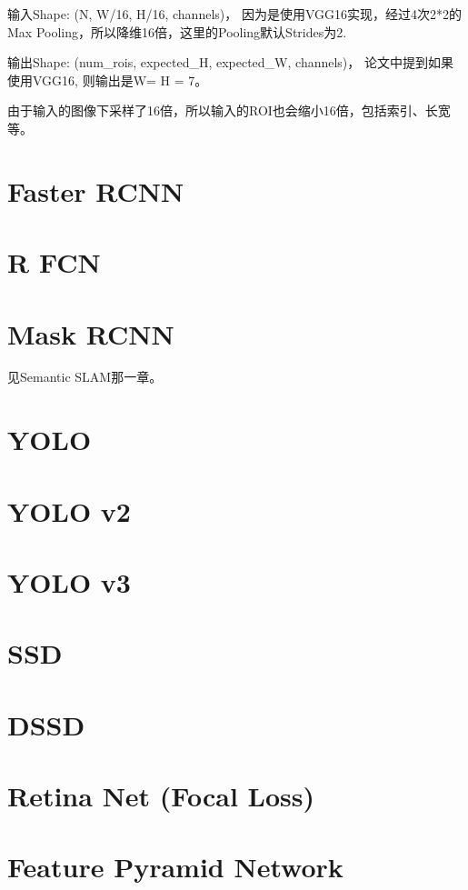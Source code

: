 输入Shape: (N, W/16, H/16, channels)， 因为是使用VGG16实现，经过4次2*2的Max Pooling，所以降维16倍，这里的Pooling默认Strides为2.

输出Shape: (num\_rois, expected\_H, expected\_W, channels)， 论文中提到如果使用VGG16, 则输出是W= H = 7。

由于输入的图像下采样了16倍，所以输入的ROI也会缩小16倍，包括索引、长宽等。

\section{Faster RCNN}

\section{R FCN}

\section{Mask RCNN}
见Semantic SLAM那一章。

\section{YOLO}


\section{YOLO v2}


\section{YOLO v3}


\section{SSD}




\section{DSSD}


\section{Retina Net (Focal Loss)}

\section{Feature Pyramid Network}

